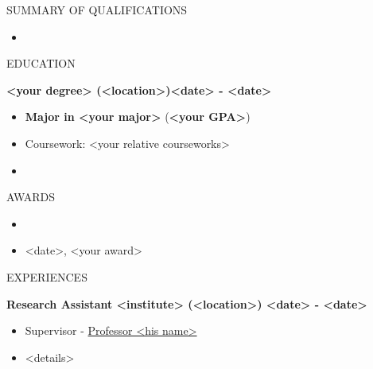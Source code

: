 \documentclass[10.5pt]{article}
\begin{document}

\begin{section}{SUMMARY OF QUALIFICATIONS}

\begin{itemize}[leftmargin=1.5em]\itemsep -0.5ex
    \item <your skills>
\end{itemize}

\end{section} 


\begin{section}{EDUCATION}

\textbf{<your degree>  (<location>)\hfill <date> - <date>}

\begin{itemize}[leftmargin=1.5em]\itemsep -0.5ex
    \item \textbf{Major in <your major>} (\textbf{<your GPA>})
    \item Coursework: <your relative courseworks>
    \item <other information>
\end{itemize}

\end{section}


\begin{section}{AWARDS}

\begin{itemize}[leftmargin=1.5em]\itemsep -0.5ex
    \item <your award>
    \item <date>, <your award>
\end{itemize}

\end{section}


\begin{section}{EXPERIENCES}

\textbf{Research Assistant \hfill <institute> (<location>) \hfill <date> - <date>}

\begin{itemize}[leftmargin=1.5em]\itemsep -0.5ex
    \item Supervisor - \href{<his website>}{Professor <his name>}
    \item <details>
\end{itemize}


\end{section}
\end{document}

